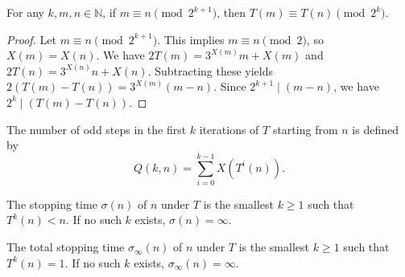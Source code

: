 \begin{lemma}\label{lemma:T_congr}\leanok
For any $k, m, n \in \mathbb{N}$, if $m \equiv n \pmod{2^{k+1}}$, then $T(m) \equiv T(n) \pmod{2^k}$.
\end{lemma}
\begin{proof}\leanok
Let $m \equiv n \pmod{2^{k+1}}$. This implies $m \equiv n \pmod 2$, so $X(m) = X(n)$.
We have $2 T(m) = 3^{X(m)} m + X(m)$ and $2 T(n) = 3^{X(n)} n + X(n)$.
Subtracting these yields $2(T(m) - T(n)) = 3^{X(m)}(m - n)$.
Since $2^{k+1} \mid (m - n)$, we have $2^k \mid (T(m) - T(n))$.
\end{proof}

\begin{definition}\label{def:num_odd_steps}\leanok
The number of odd steps in the first $k$ iterations of $T$ starting from $n$ is defined by
\begin{equation}
    Q(k, n) = \sum_{i=0}^{k-1} X(T^i(n)).
\end{equation}
\end{definition}

\begin{definition}\label{def:stopping_time}\leanok
The stopping time $\sigma(n)$ of $n$ under $T$ is the smallest $k \ge 1$ such that $T^k(n) < n$.
If no such $k$ exists, $\sigma(n) = \infty$.
\end{definition}

\begin{definition}\label{def:total_stopping_time}\leanok
The total stopping time $\sigma_\infty(n)$ of $n$ under $T$ is the smallest $k \ge 1$ such that $T^k(n) = 1$.
If no such $k$ exists, $\sigma_\infty(n) = \infty$.
\end{definition}
